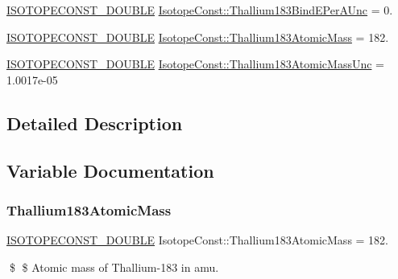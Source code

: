 \begin{DoxyCompactItemize}
\mbox{\hyperlink{group___isotope_const-_macros_ga8f45a7272ce02c0b4c65c44636ed719a}{I\+S\+O\+T\+O\+P\+E\+C\+O\+N\+S\+T\+\_\+\+D\+O\+U\+B\+LE}} \mbox{\hyperlink{group___isotope_const-_thallium-_tl183_gaf2388e2233eb084b10ea82a4f4d63061}{Isotope\+Const\+::\+Thallium183\+Bind\+E\+Per\+A\+Unc}} = 0.
\item 
\mbox{\hyperlink{group___isotope_const-_macros_ga8f45a7272ce02c0b4c65c44636ed719a}{I\+S\+O\+T\+O\+P\+E\+C\+O\+N\+S\+T\+\_\+\+D\+O\+U\+B\+LE}} \mbox{\hyperlink{group___isotope_const-_thallium-_tl183_gac38f11ecec8fa2c01da473e690fa5eeb}{Isotope\+Const\+::\+Thallium183\+Atomic\+Mass}} = 182.
\item 
\mbox{\hyperlink{group___isotope_const-_macros_ga8f45a7272ce02c0b4c65c44636ed719a}{I\+S\+O\+T\+O\+P\+E\+C\+O\+N\+S\+T\+\_\+\+D\+O\+U\+B\+LE}} \mbox{\hyperlink{group___isotope_const-_thallium-_tl183_gaea376e17346662a1a1b0879252fe977f}{Isotope\+Const\+::\+Thallium183\+Atomic\+Mass\+Unc}} = 1.\+0017e-\/05
\end{DoxyCompactItemize}


\subsection{Detailed Description}


\subsection{Variable Documentation}
\mbox{\label{group___isotope_const-_thallium-_tl183_gac38f11ecec8fa2c01da473e690fa5eeb}} 
\subsubsection{\texorpdfstring{Thallium183\+Atomic\+Mass}{Thallium183AtomicMass}}
{\footnotesize\ttfamily \mbox{\hyperlink{group___isotope_const-_macros_ga8f45a7272ce02c0b4c65c44636ed719a}{I\+S\+O\+T\+O\+P\+E\+C\+O\+N\+S\+T\+\_\+\+D\+O\+U\+B\+LE}} Isotope\+Const\+::\+Thallium183\+Atomic\+Mass = 182.}

\$ \$ Atomic mass of Thallium-\/183 in amu. \mbox{\label{group___isotope_const-_thallium-_tl183_gaea376e17346662a1a1b0879252fe977f}} 
